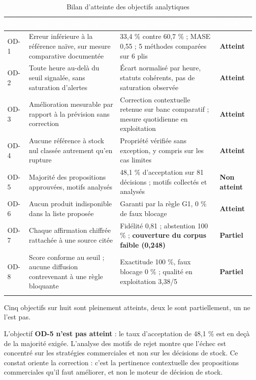 \begin{longtable}{|P{1.1cm}|P{4.2cm}|P{4.6cm}|P{3.3cm}|}
\hline
{}
\textcolor{white}{\textbf{Réf.}} &
\textcolor{white}{\textbf{Critère fixé au ch. 2}} &
\textcolor{white}{\textbf{Résultat obtenu}} &
\textcolor{white}{\textbf{Verdict}} \\
\hline
\endhead
\hline
\endfoot
\hline
\endlastfoot
OD-1 & Erreur inférieure à la référence naïve, sur mesure comparative documentée & 33{,}4 \% contre 60{,}7 \% ; MASE 0{,}55 ; 5 méthodes comparées sur 6 plis & \textbf{Atteint} \\
\hline
OD-2 & Toute heure au-delà du seuil signalée, sans saturation d'alertes & Écart normalisé par heure, statuts cohérents, pas de saturation observée & \textbf{Atteint} \\
\hline
OD-3 & Amélioration mesurable par rapport à la prévision sans correction & Correction contextuelle retenue sur banc comparatif ; mesure quotidienne en exploitation & \textbf{Atteint} \\
\hline
OD-4 & Aucune référence à stock nul classée autrement qu'en rupture & Propriété vérifiée sans exception, y compris sur les cas limites & \textbf{Atteint} \\
\hline
OD-5 & Majorité des propositions approuvées, motifs analysés & 48{,}1 \% d'acceptation sur 81 décisions ; motifs collectés et analysés & \textbf{Non atteint} \\
\hline
OD-6 & Aucun produit indisponible dans la liste proposée & Garanti par la règle G1, 0 \% de faux blocage & \textbf{Atteint} \\
\hline
OD-7 & Chaque affirmation chiffrée rattachée à une source citée & Fidélité 0{,}81 ; abstention 100 \% ; \textbf{couverture du corpus faible (0{,}248)} & \textbf{Partiel} \\
\hline
OD-8 & Score conforme au seuil ; aucune diffusion contrevenant à une règle bloquante & Exactitude 100 \%, faux blocage 0 \% ; qualité en exploitation 3{,}38/5 & \textbf{Partiel} \\
\hline
\caption{Bilan d'atteinte des objectifs analytiques}
\label{tab:bilan-od-chap5}
\end{longtable}
\endgroup

Cinq objectifs sur huit sont pleinement atteints, deux le sont partiellement, un ne l'est pas.

L'objectif \textbf{OD-5 n'est pas atteint} : le taux d'acceptation de 48,1 \% est en deçà de la majorité exigée. L'analyse des motifs de rejet montre que l'échec est concentré sur les stratégies commerciales et non sur les décisions de stock. Ce constat oriente la correction : c'est la pertinence contextuelle des propositions commerciales qu'il faut améliorer, et non le moteur de décision de stock.

